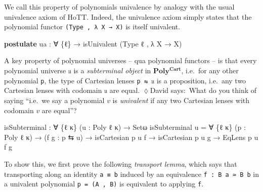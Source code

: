 \documentclass[
  11pt,
  oneside,
  article]{memoir}
\newenvironment{Shaded}{}{}
\newcommand{\KeywordTok}[1]{\textcolor[rgb]{0.00,0.44,0.13}{\textbf{#1}}}
\newcommand{\NormalTok}[1]{#1}
\newcommand{\OtherTok}[1]{\textcolor[rgb]{0.00,0.44,0.13}{#1}}
\theoremstyle{definition}
\theoremstyle{plain}
\newcommand{\0}{\textsf{0}}
\newcommand{\1}{\tn{\textsf{1}}}
\newcommand{\dnote}[1]{{\quad \color{blue}$\lozenge$\;David says:}~#1\;{\color{blue}$\lozenge$}\quad}
\begin{document}
We call this property of polynomials univalence by analogy with the
usual univalence axiom of HoTT. Indeed, the univalence axiom simply
states that the polynomial functor \texttt{(Type\ ,\ λ\ X\ →\ X)} is
itself univalent.

\begin{Shaded}
\begin{Highlighting}[]
\KeywordTok{postulate}
\NormalTok{    ua }\OtherTok{:} \OtherTok{∀} \OtherTok{\{}\NormalTok{ℓ}\OtherTok{\}} \OtherTok{→}\NormalTok{ isUnivalent }\OtherTok{(}\NormalTok{Type ℓ , }\OtherTok{λ}\NormalTok{ X }\OtherTok{→}\NormalTok{ X}\OtherTok{)}
\end{Highlighting}
\end{Shaded}

A key property of polynomial universes -- qua polynomial functors -- is
that every polynomial universe \texttt{𝔲} is a \emph{subterminal object}
in \(\mathbf{Poly^{Cart}}\), i.e.~for any other polynomial \texttt{p},
the type of Cartesian lenses \texttt{p\ ⇆\ 𝔲} is a proposition, i.e.~any
two Cartesian lenses with codomain \texttt{𝔲} are equal. \dnote{What do you think of saying ``i.e.~we say a polynomial $v$ is \emph{univalent} if any
two Cartesian lenses with codomain $v$ are equal''?}

\begin{Shaded}
\begin{Highlighting}[]
\NormalTok{isSubterminal }\OtherTok{:} \OtherTok{∀} \OtherTok{\{}\NormalTok{ℓ κ}\OtherTok{\}} \OtherTok{(}\NormalTok{u }\OtherTok{:}\NormalTok{ Poly ℓ κ}\OtherTok{)} \OtherTok{→}\NormalTok{ Setω}
\NormalTok{isSubterminal u }\OtherTok{=} \OtherTok{∀} \OtherTok{\{}\NormalTok{ℓ\textquotesingle{} κ\textquotesingle{}}\OtherTok{\}} \OtherTok{(}\NormalTok{p }\OtherTok{:}\NormalTok{ Poly ℓ\textquotesingle{} κ\textquotesingle{}}\OtherTok{)}
                  \OtherTok{→} \OtherTok{(}\NormalTok{f g }\OtherTok{:}\NormalTok{ p ⇆ u}\OtherTok{)}
                  \OtherTok{→}\NormalTok{ isCartesian p u f}
                  \OtherTok{→}\NormalTok{ isCartesian p u g}
                  \OtherTok{→}\NormalTok{ EqLens p u f g}
\end{Highlighting}
\end{Shaded}

To show this, we first prove the following \emph{transport lemma}, which
says that transporting along an identity \texttt{a\ ≡\ b} induced by an
equivalence \texttt{f\ :\ B\ a\ ≃\ B\ b} in a univalent polynomial
\texttt{p\ =\ (A\ ,\ B)} is equivalent to applying \texttt{f}.
\end{document}
